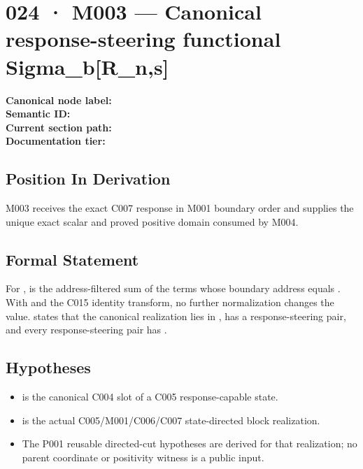 \section{024 · M003 --- Canonical response-steering functional
Sigma\_b{[}R\_n,s{]}}\label{m003-canonical-response-steering-functional-sigma_br_ns}

\textbf{Canonical node label:} \texttt{\protect{}}\\
\textbf{Semantic ID:} \texttt{\protect{}}\\
\textbf{Current section path:} \texttt{\protect{}}\\
\textbf{Documentation tier:} \texttt{\protect{}}

\subsection{Position In Derivation}\label{position-in-derivation-20}

M003 receives the exact C007 response in M001 boundary order and
supplies the unique exact scalar and proved positive domain consumed by
M004.

\subsection{Formal Statement}\label{formal-statement-8}

For \texttt{\protect{}}, \texttt{\protect{}} is
the address-filtered sum of the \texttt{\protect{}} terms whose
boundary address equals \texttt{\protect{}}. With \texttt{\protect{}} and the
C015 identity transform, no further normalization changes the value.
\texttt{\protect{}} states that the canonical
realization lies in \texttt{\protect{}}, has a
response-steering pair, and every response-steering pair has
\texttt{\protect{}}.

\subsection{Hypotheses}\label{hypotheses-8}

\begin{itemize}
\tightlist
\item
  \texttt{\protect{}} is the canonical C004 slot of a C005 response-capable
  state.
\item
  \texttt{\protect{}} is the actual C005/M001/C006/C007 state-directed
  block realization.
\item
  The P001 reusable directed-cut hypotheses are derived for that
  realization; no parent coordinate or positivity witness is a public
  input.
\end{itemize}

